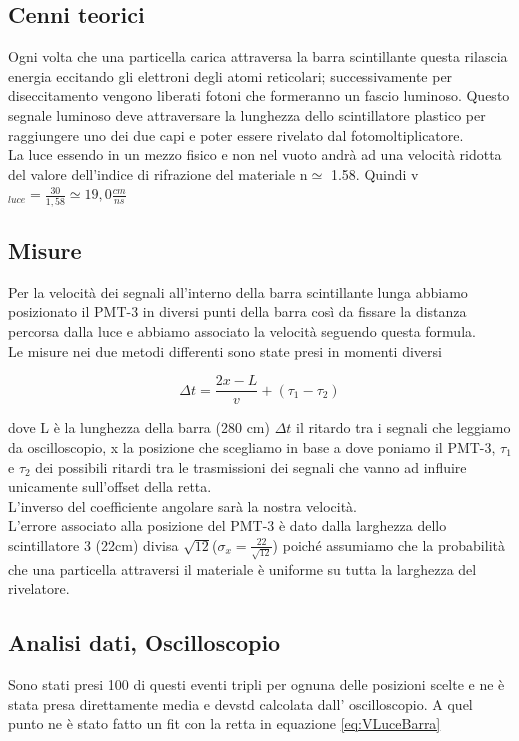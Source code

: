 \documentclass[a4paper]{article}
\begin{document}
\subsection{Cenni teorici}
Ogni volta che una particella carica attraversa la barra scintillante questa rilascia energia eccitando gli elettroni degli atomi reticolari; successivamente per diseccitamento vengono liberati fotoni che formeranno un fascio luminoso. Questo segnale luminoso deve attraversare la lunghezza dello scintillatore plastico per raggiungere uno dei due capi e poter essere rivelato dal fotomoltiplicatore.\\
La luce essendo in un mezzo fisico e non nel vuoto andrà ad una velocità ridotta del valore dell'indice di rifrazione del materiale n$\simeq$ 1.58. Quindi v$_{luce} = \frac{30}{1,58} \simeq 19,0 \frac{cm}{ns}$

\subsection{Misure}
Per la velocità dei segnali all'interno della barra scintillante lunga abbiamo posizionato il PMT-3 in diversi punti della barra così da fissare la distanza percorsa dalla luce e abbiamo associato la velocità seguendo questa formula.\\
Le misure nei due metodi differenti sono state presi in momenti diversi 

\begin{equation}
\Delta t = \frac{2x-L}{v} + (\tau_1 - \tau_2)
\label{eq:VLuceBarra}
\end{equation}

dove L è la lunghezza della barra (280 cm) $\Delta t$ il ritardo tra i segnali che leggiamo da oscilloscopio, x la posizione che scegliamo in base a dove poniamo il PMT-3, $\tau_1$ e $\tau_2$ dei possibili ritardi tra le trasmissioni dei segnali che vanno ad influire unicamente sull'offset della retta.\\
L'inverso del coefficiente angolare sarà la nostra velocità.\\
L'errore associato alla posizione del PMT-3 è dato dalla larghezza dello scintillatore 3 (22cm) divisa $\sqrt{12}$($\sigma _x = \frac{22}{\sqrt{12}}$) poiché assumiamo che la probabilità che una particella attraversi il materiale è uniforme su tutta la larghezza del rivelatore.


\subsection{Analisi dati, Oscilloscopio}
Sono stati presi 100 di questi eventi tripli per ognuna delle posizioni scelte e ne è stata presa direttamente media e devstd calcolata dall' oscilloscopio. A quel punto ne è stato fatto un fit con la retta in equazione \ref{eq:VLuceBarra}
\end{document}
